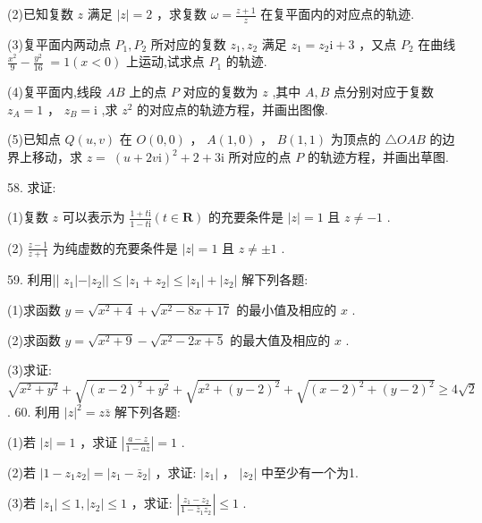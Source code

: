 \documentclass[10pt]{article}
\begin{document}
(2)已知复数 \(z\) 满足 \(\left| z\right|  = 2\) ，求复数 \(\omega  = \frac{z + 1}{z}\) 在复平面内的对应点的轨迹.

(3)复平面内两动点 \({P}_{1},{P}_{2}\) 所对应的复数 \({z}_{1},{z}_{2}\) 满足 \({z}_{1} = {z}_{2}\mathrm{i} + 3\) ，又点 \({P}_{2}\) 在曲线 \(\frac{{x}^{2}}{9} - \frac{{y}^{2}}{16} \; = 1\left( {x < 0}\right)\) 上运动,试求点 \({P}_{1}\) 的轨迹.

(4)复平面内,线段 \({AB}\) 上的点 \(P\) 对应的复数为 \(z\) ,其中 \(A,B\) 点分别对应于复数 \({z}_{A} = 1\) ， \({z}_{B} = \mathrm{i}\) ,求 \({z}^{2}\) 的对应点的轨迹方程，并画出图像.

(5)已知点 \(Q\left( {u,v}\right)\) 在 \(O\left( {0,0}\right)\) ， \(A\left( {1,0}\right)\) ， \(B\left( {1,1}\right)\) 为顶点的 \(\bigtriangleup  {OAB}\) 的边界上移动，求 \(z = \; {\left( u + 2v\mathrm{i}\right) }^{2} + 2 + 3\mathrm{i}\) 所对应的点 \(P\) 的轨迹方程，并画出草图.

58. 求证:

(1)复数 \(z\) 可以表示为 \(\frac{1 + t\mathrm{i}}{1 - t\mathrm{i}}\left( {t \in  \mathbf{R}}\right)\) 的充要条件是 \(\left| z\right|  = 1\) 且 \(z \neq   - 1\) .

(2) \(\frac{z - 1}{z + 1}\) 为纯虚数的充要条件是 \(\left| z\right|  = 1\) 且 \(z \neq   \pm  1\) .

59. 利用|| \({z}_{1}\left| -\right| {z}_{2}\left| \right|  \leq  \left| {{z}_{1} + {z}_{2}}\right|  \leq  \left| {z}_{1}\right|  + \left| {z}_{2}\right|\) 解下列各题:

(1)求函数 \(y = \sqrt{{x}^{2} + 4} + \sqrt{{x}^{2} - {8x} + {17}}\) 的最小值及相应的 \(x\) .

(2)求函数 \(y = \sqrt{{x}^{2} + 9} - \sqrt{{x}^{2} - {2x} + 5}\) 的最大值及相应的 \(x\) .

(3)求证: \(\sqrt{{x}^{2} + {y}^{2}} + \sqrt{{\left( x - 2\right) }^{2} + {y}^{2}} + \sqrt{{x}^{2} + {\left( y - 2\right) }^{2}} + \sqrt{{\left( x - 2\right) }^{2} + {\left( y - 2\right) }^{2}} \geq  4\sqrt{2}\) . 60. 利用 \({\left| z\right| }^{2} = z\bar{z}\) 解下列各题:

(1)若 \(\left| z\right|  = 1\) ，求证 \(\left| \frac{a - z}{1 - a\bar{z}}\right|  = 1\) .

(2)若 \(\left| {1 - {z}_{1}{z}_{2}}\right|  = \left| {{z}_{1} - {\bar{z}}_{2}}\right|\) ，求证: \(\left| {z}_{1}\right|\) ， \(\left| {z}_{2}\right|\) 中至少有一个为1.

(3)若 \(\left| {z}_{1}\right|  \leq  1,\left| {z}_{2}\right|  \leq  1\) ，求证: \(\left| \frac{{z}_{1} - {z}_{2}}{1 - {\bar{z}}_{1}{z}_{2}}\right|  \leq  1\) .
\end{document}
